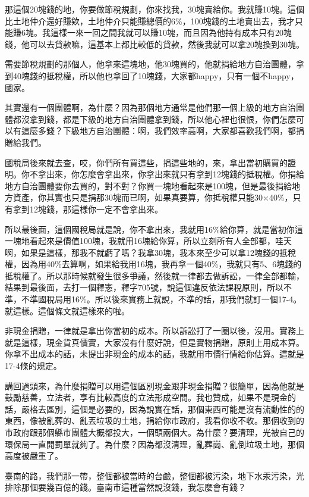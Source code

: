 \documentclass[oneside,sub3section]{ctexbook}
\begin{document}
那這個20塊錢的地，你要做節稅規劃，你來找我，30塊賣給你。我就賺10塊。這個比土地仲介還好賺欸，土地仲介只能賺總價的6\%，100塊錢的土地賣出去，我才只能賺6塊。我這樣一來一回之間我就可以賺10塊，而且因為他持有成本只有20塊錢，他可以去貸款嘛，這基本上都比較低的貸款，然後我就可以拿20塊換到30塊。

需要節稅規劃的那個人，他拿來這塊地，他30塊買的，他就捐給地方自治團體，拿到40塊錢的抵稅權，所以他也拿回了10塊錢，大家都happy，只有一個不happy，國家。

其實還有一個團體啊，為什麼？因為那個地方通常是他們那一個上級的地方自治團體都沒拿到錢，都是下級的地方自治團體拿到錢，所以他心裡也很恨，你們怎麼可以有這麼多錢？下級地方自治團體：啊，我們效率高啊，大家都喜歡我們啊，都捐贈給我們。

國稅局後來就去查，哎，你們所有買這些，捐這些地的，來，拿出當初購買的證明。你不拿出來，你怎麼會拿出來，你拿出來就只有拿到12塊錢的抵稅權。你捐給地方自治團體要你去買的，對不對？你買一塊地看起來是100塊，但是最後捐給地方資產，你其實也只是捐那30塊而已啊，如果真要算，你抵稅權只能30×40\%，只有拿到12塊錢，那這樣你一定不會拿出來。

所以最後面，這個國稅局就是說，你不拿出來，我就用16\%給你算，就是當初你這一塊地看起來是價值100塊，我就用16塊給你算，所以立刻所有人全部都，哇天啊，如果是這樣，那我不就虧了嗎？我拿30塊，我本來至少可以拿12塊錢的抵稅權，因為用40\%去算啊，如果給我用16塊，我再拿一個40\%，我就只有5、6塊錢的抵稅權了。所以那時候就發生很多爭議，然後就一律都去做訴訟，一律全部都輸，結果到最後面，去打一個釋憲，釋字705號，說這個違反依法課稅原則，所以不準，不準國稅局用16\%。所以後來實務上就說，不準的話，那我們就訂一個17-4。就這樣。這個條文就這樣來的啦。

非現金捐贈，一律就是拿出你當初的成本。所以訴訟打了一圈以後，沒用。實務上就是這樣，現金貨真價實，大家沒有什麼好說，但是實物捐贈，原則上用成本算。你拿不出成本的話，未提出非現金的成本的話，我就用市價行情給你估算。這就是17-4條的規定。

講回過頭來，為什麼捐贈可以用這個區別現金跟非現金捐贈？很簡單，因為他就是鼓勵慈善，立法者，享有比較高度的立法形成空間。我也贊成，如果不是現金的話，嚴格去區別，這個是必要的，因為說實在話，那個東西可能是沒有流動性的的東西，像被亂葬的、亂丟垃圾的土地，捐給你市政府，我看你收不收。那個收到的市政府跟那個縣市團體大概都投大，一個頭兩個大。為什麼？要清理，光被自己的環保局一直開罰單就夠了。為什麼？因為都沒清理，亂葬崗、亂倒垃圾土地，那個高度被嚴重了。

臺南的路，我們那一帶，整個都被當時的台鹼，整個都被污染，地下水汞污染，光排除那個要幾百億的錢。臺南市這種當然說沒錢，我怎麼會有錢？
\end{document}
